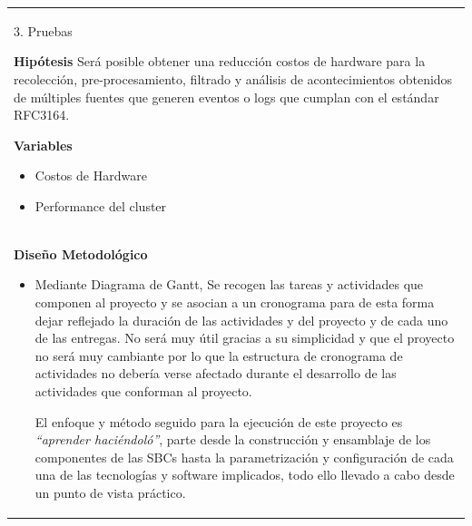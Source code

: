 \documentclass[letter,12pt]{article}
\begin{document}
\begin{center}
\begin{tabular}{|p{15.5cm}|}
\hline    
        
        3. Pruebas
  
    \textbf{Hipótesis}
    Será posible obtener una reducción costos de hardware para la recolección, pre-procesamiento, filtrado y análisis de acontecimientos obtenidos de múltiples fuentes que generen eventos o logs que cumplan con el estándar RFC3164. 
    \par
    
    \textbf{Variables}
    \begin{itemize}
        \item Costos de Hardware
        \item Performance del cluster
    \end{itemize} \\

    
    \textbf{Diseño Metodológico}
    \begin{itemize}
        \item  Mediante Diagrama de Gantt, Se recogen las tareas y actividades que componen al
proyecto y se asocian a un cronograma para de esta forma dejar reflejado la
duración de las actividades y del proyecto y de cada uno de las entregas. No será
muy útil gracias a su simplicidad y que el proyecto no será muy cambiante por lo
que la estructura de cronograma de actividades no debería verse afectado durante
el desarrollo de las actividades que conforman al proyecto.

  El enfoque y método seguido para la ejecución de este proyecto es \textit{“aprender haciéndoló”}, parte desde la construcción y ensamblaje de los componentes de las
SBCs hasta la parametrización y configuración de cada una de las tecnologías y software implicados, todo ello llevado a cabo desde un punto de vista práctico.
        
        
    \end{itemize}\\  
        
\hline
\end{tabular}
\end{center}
\end{document}
